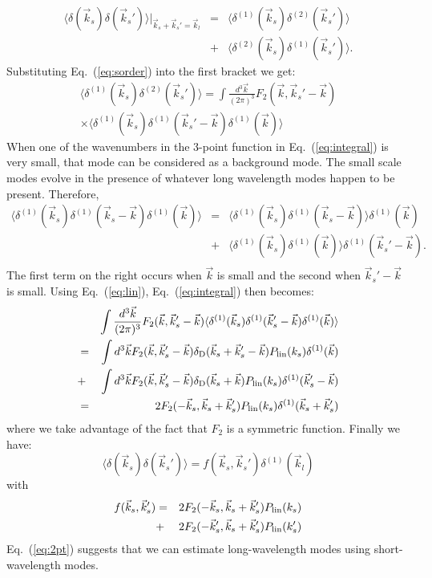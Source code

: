 \documentclass[prd,amsmath,amssymb,floatfix,superscriptaddress,nofootinbib,twocolumn]{revtex4-1}
\def\be{\begin{equation}}
\def\ee{\end{equation}}
\def\bea{\begin{eqnarray}}
\def\eea{\end{eqnarray}}
\newcommand{\vs}{\nonumber\\}
\newcommand{\vk}{\vec{k}}
\newcommand{\ec}[1]{Eq.~(\ref{eq:#1})}
\newcommand{\eql}[1]{\label{eq:#1}}
\begin{document}
\bea 
 \langle {\delta}(\vec{k}_s){\delta}(\vec{k}_s') \rangle|_{\vk_s+\vk_s'=\vk_l}&=&
  \langle {\delta}^{(1)}(\vec{k}_s){\delta}^{(2)}(\vec{k}_s') \rangle\vs
  &+&\langle {\delta}^{(2)}(\vec{k}_s){\delta}^{(1)}(\vec{k}_s') \rangle.
\eea 
Substituting \ec{sorder} into the first bracket we get:
\bea 
\langle {\delta}^{(1)}(\vec{k}_s){\delta}^{(2)}(\vec{k}_s') \rangle =  \int \frac{d^3\vec{k}}{(2\pi)^3} F_2 (\vec{k},\vec{k}_s'-\vec{k})\vs
\times \langle {\delta}^{(1)}(\vec{k}_s){\delta}^{(1)}(\vec{k}_s'-\vec{k}){\delta}^{(1)}(\vec{k}) \rangle \eql{integral}
\eea 
When one of the wavenumbers in the 3-point function in \ec{integral} is very small, that mode can be considered as a background mode. The small scale modes evolve in the presence of whatever long wavelength modes happen to be present. Therefore, 
\bea
\langle
\delta^{(1)}(\vk_{s}) \delta^{(1)}(\vk_{s}-\vk){\delta^{(1)}}(\vk) 
\rangle
&=&\langle {\delta^{(1)}}(\vk_{s}) {\delta^{(1)}}(\vk_{s}-\vk) \rangle {\delta^{(1)}}(\vk)  \vs
&+&\langle {\delta^{(1)}}(\vk_{s}) {\delta^{(1)}}(\vk) \rangle {\delta^{(1)}}(\vk_s'-\vk) .
\vs
\eql{contraction}
\eea
The first term on the right occurs when $\vk$ is small and the second when $\vk_s'-\vk$ is small.
Using \ec{lin}, \ec{integral} then becomes:
\bea 
&&\int \frac{d^3\vec{k}}{(2\pi)^3} F_2 (\vec{k},\vec{k}_s'-\vec{k})\langle {\delta}^{(1)}(\vec{k}_s){\delta}^{(1)}(\vec{k}_s'-\vec{k}){\delta}^{(1)}(\vec{k}) \rangle \vs
&=&\int d^3\vk F_2(\vec{k},\vec{k}_s'-\vec{k}) \delta_{\rm D}(\vk_s+\vk_s'-\vk)P_{\rm lin}(k_s){\delta}^{(1)}(\vec{k}) \vs
&+&\int d^3\vk F_2(\vec{k},\vec{k}_s'-\vec{k}) \delta_{\rm D}(\vk_s+\vk)P_{\rm lin}(k_s){\delta}^{(1)}(\vk_s'-\vk) \vs
&=&2F_2(-\vk_s,\vk_s+\vk_s')P_{\rm lin}(k_s){\delta}^{(1)}(\vk_s+\vk_s')
\eea 
where we take advantage of the fact that $F_2$ is a symmetric function. Finally we have:
\be 
\langle {\delta}(\vec{k}_s){\delta}(\vec{k}_s') \rangle =f(\vec{k}_s,\vec{k}_s'){\delta}^{(1)}(\vec{k}_l) \eql{2pt}
\ee 
with
\bea
f(\vec{k}_s,\vec{k}_s')&=&2F_2(-\vec{k}_s,\vec{k}_s+\vec{k}_s')P_{\rm lin}(k_s)\vs
&+&2F_2(-\vec{k}_s',\vec{k}_s+\vec{k}_s')P_{\rm lin}(k_s')       
\eea 
\ec{2pt} suggests that we can estimate long-wavelength modes using short-wavelength modes.
\end{document}
